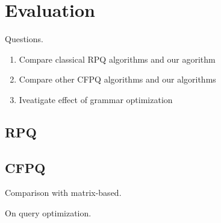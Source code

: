 \section{Evaluation}

Questions.
\begin{enumerate}
	\item Compare classical RPQ algorithms and our agorithm
	\item Compare other CFPQ algorithms and our algorithms
	\item Iveatigate effect of grammar optimization
\end{enumerate}

\subsection{RPQ}

\subsection{CFPQ}

Comparison with matrix-based.

On query optimization.
